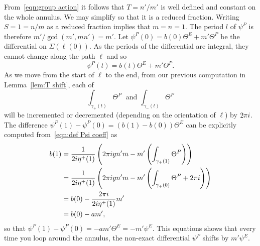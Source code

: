 \documentclass{article}
\begin{document}
From~\eqref{eqn:group action} it follows that $T = n'/m'$ is well defined and constant on the whole annulus. We may simplify so that it is a reduced fraction. Writing $S=1=n/m$ as a reduced fraction implies that $m=n=1$. The period $l$ of $\psi^P$ is therefore $m' / \gcd(m',mn') = m'$.
Let $\psi^P(0) = b(0)\Theta^E + m' \Theta^P$ be the differential on $\Sigma(\ell(0))$. As the periods of the differential are integral, they cannot change along the path $\ell$ and so
\[
\psi^P(t) = b(t) \Theta^E + m' \Theta^P.
\]
As we move from the start of $\ell$ to the end, from our previous computation in Lemma~\ref{lem:T shift}, each of
\[
\int_{\gamma_+(t)} \Theta^P \;\text{ and } \int_{\gamma_-(t)} \Theta^P
\]
will be incremented or decremented (depending on the orientation of $\ell$) by $2\pi i$. The difference $\psi^P(1) - \psi^P(0) = (b(1)-b(0))\Theta^E$ can be explicitly computed from~\eqref{eqn:def Psi coeff} as
\begin{align*}
b(1)
&= \frac{1}{2i \eta^+(1)}\left( 2\pi i y n'm - m' \left(\int_{\gamma_+(1)} \Theta^P\right) \right) \\
&= \frac{1}{2i \eta^+(1)}\left( 2\pi i y n'm - m' \left(\int_{\gamma_+(0)} \Theta^P + 2\pi i\right) \right) \\
&= b(0) - \frac{2\pi i}{2i \eta^+(1)}m' \\
&= b(0) - am',
\end{align*}
so that $\psi^P(1) - \psi^P(0) = -am' \Theta^E = - m' \psi^E$. This equations shows that every time you loop around the annulus, the non-exact differential $\psi^P$ shifts by $m' \psi^E$.
\end{document}

